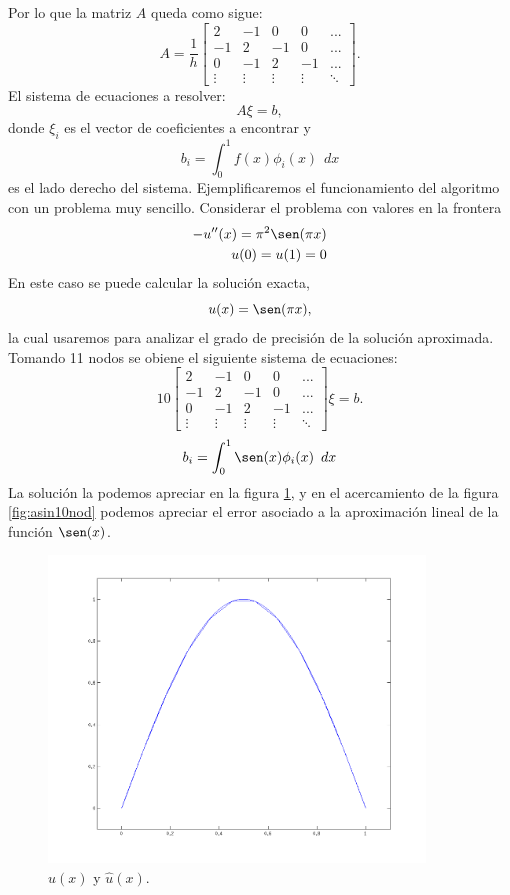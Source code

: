 \documentclass[12pt,spanish,oneside]{book}
\theoremstyle{plain}
\numberwithin{equation}{chapter}
\theoremstyle{definition}
\theoremstyle{remark}
\newcommand{\icu}{\int_0^1}
\newcommand{\dx}{\hspace{5pt} dx}
\begin{document}
Por lo que la matriz $A$ queda como sigue:
$$A=\frac{1}{h}\left[
\begin{array}{ccccc}
2&-1&0&0&...\\
-1&2&-1&0&...\\
0&-1&2&-1&...\\
\vdots&\vdots&\vdots&\vdots&\ddots
\end{array}\right].$$
El sistema de ecuaciones a resolver:
\[A\xi=b,\]
donde $\xi_i$ es el vector de coeficientes a encontrar y \[b_i=\icu f(x)\phi_i(x)\dx\]es el lado derecho del sistema.
Ejemplificaremos el funcionamiento del algoritmo con un problema muy sencillo. Considerar el problema con valores en la frontera
\begin{eqnarray*}
-u''(x)=\pi^2\sen(\pi x)\\
u(0)=u(1)=0
\end{eqnarray*}
En este caso se puede calcular la solución exacta, \[u(x)=\sen(\pi x),\]la cual usaremos para analizar el grado de precisión de la solución aproximada. 
Tomando 11 nodos se obiene el siguiente sistema de ecuaciones:
\[10 \left[
\begin{array}{ccccc}
2&-1&0&0&...\\
-1&2&-1&0&...\\
0&-1&2&-1&...\\
\vdots&\vdots&\vdots&\vdots&\ddots
\end{array}\right] \xi=b.\]
\[b_i=\icu \sen(x)\phi_i(x)\dx\]
La solución la podemos apreciar en la figura \ref{fig:sin10nod}, y en el acercamiento de la figura \ref{fig:asin10nod} podemos apreciar el error asociado a la aproximación lineal de la función $\sen(x)$.
\begin{figure}[H]
\centering
\includegraphics[width=10cm]{img/sin10nod.png}
\caption{$u(x)$ y $\hat{u}(x)$.}
\label{fig:sin10nod}
\end{figure}
\end{document}
